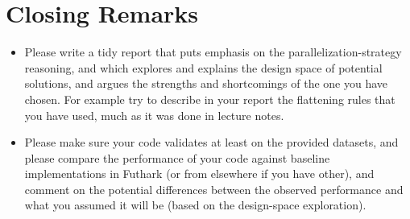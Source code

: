 \documentclass[a4paper,11pt]{article}
\begin{document}
\section{Closing Remarks}

\begin{itemize}
    \item Please write a tidy report that puts emphasis on the parallelization-strategy
            reasoning, and which explores and explains the design space of
            potential solutions, and argues the strengths and shortcomings of
            the one you have chosen.  For example try to describe in your
            report the flattening rules that you have used, much as it was
            done in lecture notes.

    \item Please make sure your code validates at least on the provided datasets,
            and please compare the performance of your code against baseline 
            implementations in Futhark (or from elsewhere if you have other), 
            and comment on the potential differences between the observed
            performance and what you assumed it will be (based on the
            design-space exploration).

\end{itemize}



%
\end{document}
